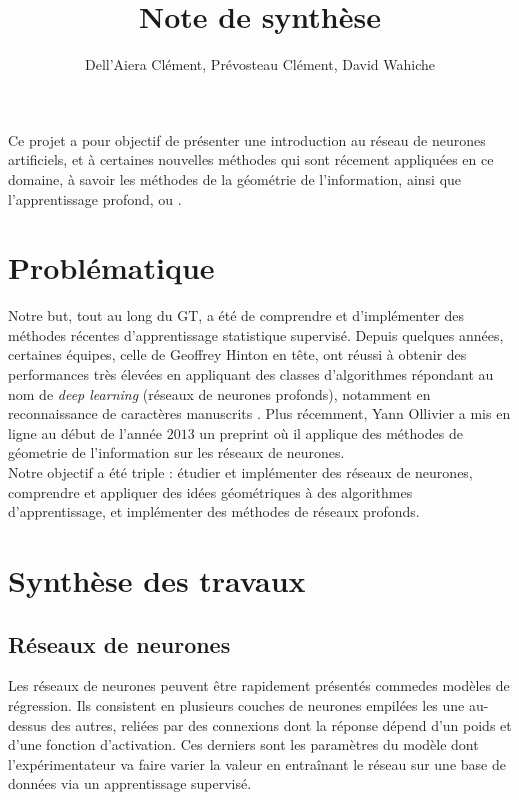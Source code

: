 \documentclass{article}
\title{Note de synthèse}
\author{Dell'Aiera Clément, Prévosteau Clément, David Wahiche}
\date{}
\begin{document}
\maketitle


Ce projet a pour objectif de présenter une introduction au réseau de neurones artificiels, et à certaines nouvelles méthodes qui sont récement appliquées en ce domaine, à savoir les méthodes de la géométrie de l'information, ainsi que l'apprentissage profond, ou .\\

\section{Problématique}

Notre but, tout au long du GT, a été de comprendre et d'implémenter des méthodes récentes d'apprentissage statistique supervisé. Depuis quelques années, certaines équipes, celle de Geoffrey Hinton en tête, ont réussi à obtenir des performances très élevées en appliquant des classes d'algorithmes répondant au nom de \textit{deep learning} (réseaux de neurones profonds), notamment en reconnaissance de caractères manuscrits . Plus récemment, Yann Ollivier a mis en ligne au début de l'année $2013$ un preprint où il applique des méthodes de géometrie de l'information sur les réseaux de neurones. \\

Notre objectif a été triple : étudier et implémenter des réseaux de neurones, comprendre et appliquer des idées géométriques à des algorithmes d'apprentissage, et implémenter des méthodes de réseaux profonds. \\


\section{Synthèse des travaux}

\subsection{Réseaux de neurones}
Les réseaux de neurones peuvent être rapidement présentés commedes modèles de régression. Ils consistent en plusieurs couches de neurones empilées les une au-dessus des autres, reliées par des connexions dont la réponse dépend d'un poids et d'une fonction d'activation. Ces derniers sont les paramètres du modèle dont l'expérimentateur va faire varier la valeur en entraînant le réseau sur une base de données via un apprentissage supervisé. \\
\end{document}
